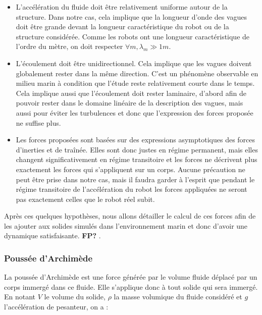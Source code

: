 				\begin{itemize}[noitemsep]
					\item[\textbullet] L'accélération du fluide doit être relativement uniforme autour de la structure. Dans notre cas, cela implique que la longueur d'onde des vagues doit être grande devant la longueur caractéristique du robot ou de la structure considérée. Comme les robots ont une longueur caractéristique de l'ordre du mètre, on doit respecter $\forall m, \lambda_m \gg 1 m$. \\
					\item[\textbullet] L'écoulement doit être unidirectionnel. Cela implique que les vagues doivent globalement rester dans la même direction. C'est un phénomène observable en milieu marin à condition que l'étude reste relativement courte dans le temps. Cela implique aussi que l'écoulement doit rester laminaire, d'abord afin de pouvoir rester dans le domaine linéaire de la description des vagues, mais aussi pour éviter les turbulences et donc que l'expression des forces proposée ne suffise plus. \\
					\item[\textbullet] Les forces proposées sont basées sur des expressions asymptotiques des forces d'inerties et de traînée. Elles sont donc justes en régime permanent, mais elles changent significativement en régime transitoire et les forces ne décrivent plus exactement les forces qui s'appliquent sur un corps. Aucune précaution ne peut être prise dans notre cas, mais il faudra garder à l'esprit que pendant le régime transitoire de l'accélération du robot les forces appliquées ne seront pas exactement celles que le robot réel subit.
				\end{itemize}

				Après ces quelques hypothèses, nous allons détailler le calcul de ces forces afin de les ajouter aux solides simulés dans l'environnement marin et donc d'avoir une dynamique satisfaisante. \color{red} \textbf{FP?} \color{black}.

			\subsubsection{Poussée d'Archimède}

				La poussée d'Archimède est une force générée par le volume fluide déplacé par un corps immergé dans ce fluide. Elle s'applique donc à tout solide qui sera immergé. En notant $V$ le volume du solide, $\rho$ la masse volumique du fluide considéré et $g$ l'accélération de pesanteur, on a :

